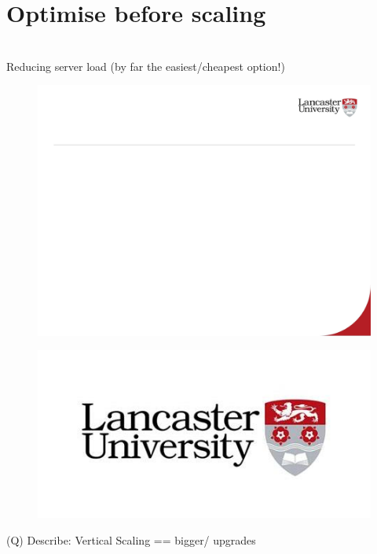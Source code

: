 \documentclass[12pt]{article}
\begin{document}
\section{Optimise before scaling}
\\
Reducing server load (by far the easiest/cheapest option!)\\
\begin{figure}[H]
\includegraphics[width=0.5\linewidth]{page71-image-1.png}
\end{figure}
\begin{figure}[H]
\includegraphics[width=0.5\linewidth]{page71-image-2.png}
\end{figure}
\clearpage
(Q)
Describe: Vertical Scaling == bigger/ upgrades
\clearpage
\end{document}
